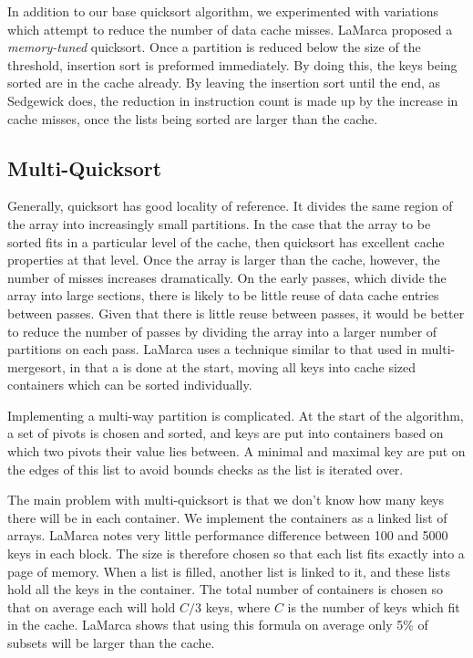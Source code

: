 \documentclass[acmtocl]{acmtrans2m}
\begin{document}
In addition to our base quicksort algorithm, we experimented with
variations which attempt to reduce the number of data cache
misses. LaMarca \cite{} proposed a \textit{memory-tuned} quicksort.
Once a partition is reduced below the size of the threshold, insertion
sort is preformed immediately. By doing this, the keys being sorted
are in the cache already. By leaving the insertion sort until the end,
as Sedgewick does, the reduction in instruction count is made up by
the increase in cache misses, once the lists being sorted are larger
than the cache.

\subsection{Multi-Quicksort}
Generally, quicksort has good locality of reference. It divides the
same region of the array into increasingly small partitions.  In the
case that the array to be sorted fits in a particular level of the
cache, then quicksort has excellent cache properties at that
level. Once the array is larger than the cache, however, the number of
misses increases dramatically. On the early passes, which divide the
array into large sections, there is likely to be little reuse of data
cache entries between passes. Given that there is little reuse between
passes, it would be better to reduce the number of passes by dividing
the array into a larger number of partitions on each pass. LaMarca
uses a technique similar to that used in multi-mergesort, in that a
 is done at the start, moving all keys into
cache sized containers which can be sorted individually.

Implementing a multi-way partition is complicated. At the start of the
algorithm, a set of pivots is chosen and sorted, and keys are put into
containers based on which two pivots their value lies between. A
minimal and maximal key are put on the edges of this list to avoid
bounds checks as the list is iterated over.

The main problem with multi-quicksort is that we don't know how many
keys there will be in each container. We implement the containers as a
linked list of arrays. LaMarca notes very little performance
difference between 100 and 5000 keys in each block. The size is
therefore chosen so that each list fits exactly into a page of
memory. When a list is filled, another list is linked to it, and these
lists hold all the keys in the container. The total number of
containers is chosen so that on average each will hold $C/3$ keys,
where $C$ is the number of keys which fit in the cache. LaMarca shows
that using this formula on average only 5\% of subsets will be larger
than the cache.
\end{document}
